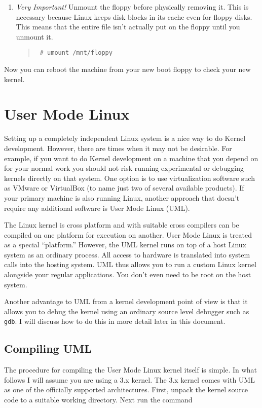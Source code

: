 \documentclass{article}
\newcommand{\command}[1]{\texttt{#1}}    %
\newenvironment{commands}
  {\begin{quote} \tt}
  {\end{quote}}
\begin{document}
\begin{enumerate}
\item \emph{Very Important!} Unmount the floppy before physically removing it. This is necessary
  because Linux keeps disk blocks in its cache even for floppy disks. This means that the entire
  file isn't actually put on the floppy until you unmount it.
\begin{commands}
\# umount /mnt/floppy
\end{commands}

\end{enumerate}

Now you can reboot the machine from your new boot floppy to check your new kernel.

\section{User Mode Linux}
\label{sec:UML}

Setting up a completely independent Linux system is a nice way to do Kernel development.
However, there are times when it may not be desirable. For example, if you want to do Kernel
development on a machine that you depend on for your normal work you should not risk running
experimental or debugging kernels directly on that system. One option is to use virtualization
software such as VMware or VirtualBox (to name just two of several available products). If your
primary machine is also running Linux, another approach that doesn't require any additional
software is User Mode Linux (UML).

The Linux kernel is cross platform and with suitable cross compilers can be compiled on one
platform for execution on another. User Mode Linux is treated as a special ``platform.''
However, the UML kernel runs on top of a host Linux system as an ordinary process. All access to
hardware is translated into system calls into the hosting system. UML thus allows you to run a
custom Linux kernel alongside your regular applications. You don't even need to be root on the
host system.

Another advantage to UML from a kernel development point of view is that it allows you to debug
the kernel using an ordinary source level debugger such as \command{gdb}. I will discuss how to
do this in more detail later in this document.

\subsection{Compiling UML}

The procedure for compiling the User Mode Linux kernel itself is simple. In what follows I will
assume you are using a 3.x kernel. The 3.x kernel comes with UML as one of the officially
supported architectures. First, unpack the kernel source code to a suitable working directory.
Next run the command
\end{document}
